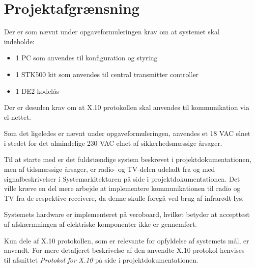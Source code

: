 \chapter{Projektafgrænsning}
Der er som nævnt under opgaveformuleringen krav om at systemet skal indeholde:
\begin{itemize}
\item 1 PC som anvendes til konfiguration og styring
\item 1 STK500 kit som anvendes til central transmitter controller
\item 1 DE2-kodelås
\end{itemize}
Der er desuden krav om at X.10 protokollen \cite[s. 12]{lib:AN236} skal anvendes til kommunikation via el-nettet. 

Som det ligeledes er nævnt under opgaveformuleringen, anvendes et 18 VAC elnet i stedet for det almindelige 230 VAC elnet af sikkerhedsmæssige årsager. 

Til at starte med er det fuldstændige system beskrevet i projektdokumentationen, men af tidsmæssige årsager, er radio- og TV-delen udeladt fra og med signalbeskrivelser i Systemarkitekturen på side \pageref{P-tbl:signalbeskriv} i projektdokumentationen.
Det ville kræve en del mere arbejde at implementere kommunikationen til radio og TV fra de respektive receivere, da denne skulle foregå ved brug af infrarødt lys. 

Systemets hardware er implementeret på veroboard, hvilket betyder at accepttest af afskærmningen af elektriske komponenter ikke er gennemført. 

Kun dele af X.10 protokollen, som er relevante for opfyldelse af systemets mål, er anvendt. 
For mere detaljeret beskrivelse af den anvendte X.10 protokol henvises til afsnittet \textit{Protokol for X.10} på side \pageref{P-prot_x10} i projektdokumentationen.
\clearpage
